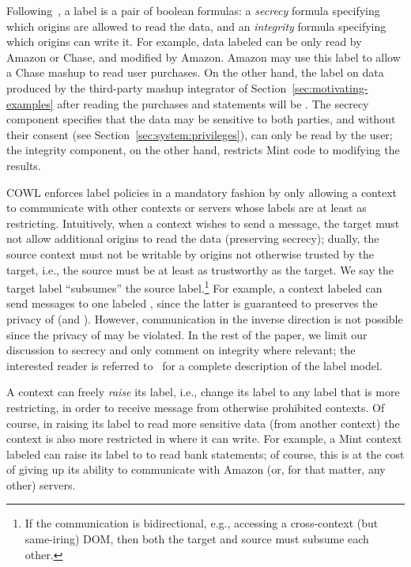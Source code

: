 Following~\cite{yang:2013:towards, stefan:2011:dclabels}, a label is a
pair of boolean formulas: a \emph{secrecy} formula specifying which
origins are allowed to read the data, and an \emph{integrity} formula
specifying which origins can write it.
%
For example, data labeled 
can be only read by Amazon or Chase, and modified by Amazon.
%
Amazon may use this label to allow a Chase mashup to read
user purchases.
%
On the other hand, the label on data produced by the third-party
mashup integrator of Section~\ref{sec:motivating-examples} after
reading the purchases and statements will be
.
%
The secrecy component specifies that the data may be sensitive to both
parties, and without their consent (see
Section~\ref{sec:system:privileges}), can only be read by the user;
the integrity component, on the other hand, restricts Mint code to
modifying the results.
 
COWL enforces label policies in a mandatory fashion by only allowing a
context to communicate with other contexts or servers whose labels are
at least as restricting.
%
Intuitively, when a context wishes to send a message, the target must
not allow additional origins to read the data (preserving secrecy);
dually, the source context must not be writable by origins not
otherwise trusted by the target, i.e., the source must be at least as
trustworthy as the target.
%
We say the target label ``subsumes'' the source label.\footnote{
  If the communication is bidirectional, e.g., accessing a
cross-context (but same-iring) DOM, then both the target and source
must subsume each other.}
%
For example, a context labeled
 can send messages to
one labeled , since the latter is guaranteed
to preserves the privacy of  (and
).
%
However, communication in the inverse direction is not possible since
the privacy of  may be violated.
%
In the rest of the paper, we limit our discussion to secrecy and only
comment on integrity where relevant; the interested reader is referred
to~\cite{stefan:2011:dclabels} for a complete description of the label
model.

A context can freely \emph{raise} its label, i.e., change its label to
any label that is more restricting, in order to receive message
from otherwise prohibited contexts.
%
Of course, in raising its label to read more sensitive data (from
another context) the context is also more restricted in where it can
write.
%
For example, a Mint context labeled
 can raise its label to
 to read bank statements; of
course, this is at the cost of giving up its ability to communicate
with Amazon (or, for that matter, any other) servers.

